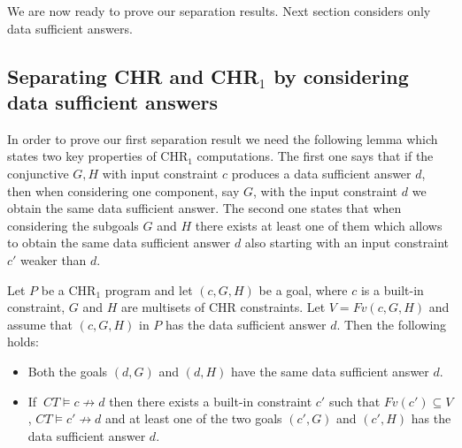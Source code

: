 We are now ready to prove our separation results. Next section considers only data sufficient answers.







\subsection{Separating CHR and CHR$_1$ by considering data sufficient answers}

In order to prove our first separation result we need the following lemma which states two key properties of CHR$_1$ computations.
The first one says that if the conjunctive $G,H$ with input constraint $c$ produces a data sufficient answer $d$, then when considering one component, say $G$, with the input constraint $d$
we obtain the same data sufficient answer.  The second one states that when considering the subgoals $G$ and $H$ there exists at least one of them which allows to obtain the same data sufficient answer $d$ also starting with an input constraint $c'$ weaker than $d$.





\begin{lemma}\label{lem:preservarisposte}
 Let $P$ be a CHR$_1$ program  and let $ (c, G, H)$ be a goal, where $c$ is a built-in constraint, $G$ and $H$ are multisets of CHR constraints. Let $V=Fv(c,G,H)$ and assume that $ (c, G, H)$ in $P$ has the data sufficient answer $d$.
Then the following holds:
\begin{itemize}
\item
Both the goals $(d, G)$  and
$(d, H)$ have the same data sufficient answer $d$.
\item If $\ CT \models c \not \rightarrow d$ then there exists a built-in constraint $c'$ such that $Fv(c') \subseteq V$, $CT \models c' \not \rightarrow d$ and
at least one of the two goals  $(c', G)$ and $(c', H)$ has the data sufficient answer $d$.
\end{itemize}

\end{lemma}


